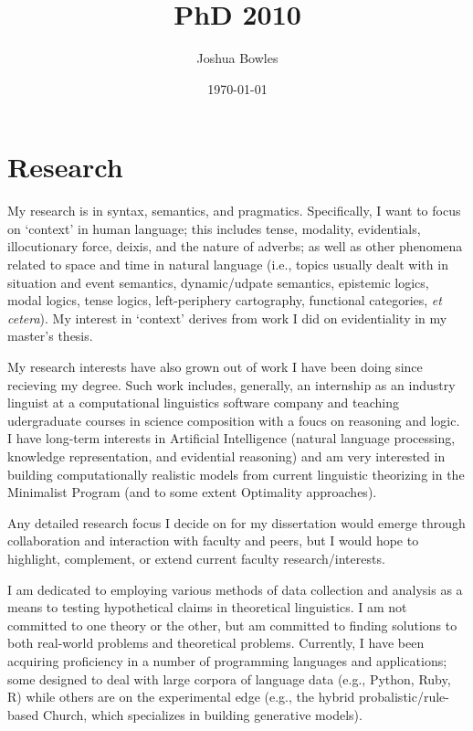 \documentclass{article}
\begin{document}
 \title{PhD 2010}
\author{Joshua Bowles}
\date{\today}

\maketitle

\section{Research}
My research is in syntax, semantics, and pragmatics. Specifically, I want to focus on `context' in human language; this includes tense, modality, evidentials, illocutionary force, deixis, and the nature of adverbs; as well as other phenomena related to space and time in natural language (i.e., topics usually dealt with in situation and event semantics, dynamic/udpate semantics, epistemic logics, modal logics, tense logics, left-periphery cartography, functional categories, {\sl et cetera}). My interest in `context' derives from work I did on evidentiality in my master's thesis. %

My research interests have also grown out of work I have been doing since recieving my degree. Such work includes, generally, an internship as an industry linguist at a computational linguistics software company and teaching udergraduate courses in science composition with a foucs on reasoning and logic. I have long-term interests in Artificial Intelligence (natural language processing, knowledge representation, and evidential reasoning) and am very interested in building computationally realistic models from current linguistic theorizing in the Minimalist Program (and to some extent Optimality approaches).

Any detailed research focus I decide on for my dissertation would emerge through collaboration and interaction with faculty and peers, but I would hope to highlight, complement, or extend current faculty research/interests. 

I  am dedicated to employing various methods of data collection and analysis as a means to testing hypothetical claims in theoretical linguistics. I am not committed to one theory or the other, but am committed to finding solutions to both real-world problems and theoretical problems. Currently, I have been acquiring proficiency in a number of programming languages and applications; some designed to deal with large corpora of language data (e.g., Python, Ruby, R) while others are on the experimental edge (e.g., the hybrid probalistic/rule-based Church, which specializes in building generative models). 
\end{document}
